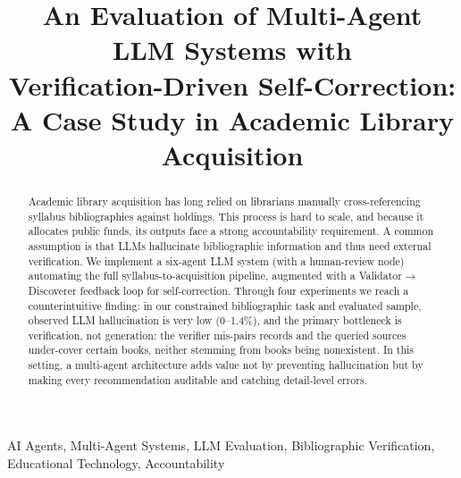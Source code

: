 \documentclass[conference]{IEEEtran}
\begin{document}
\title{An Evaluation of Multi-Agent LLM Systems with\\
Verification-Driven Self-Correction:\\
A Case Study in Academic Library Acquisition}

\author{
\and
{}
}

\maketitle

\begin{abstract}
Academic library acquisition has long relied on librarians manually
cross-referencing syllabus bibliographies against holdings. This process is hard
to scale, and because it allocates public funds, its outputs face a strong
accountability requirement. A common assumption is that LLMs hallucinate bibliographic
information and thus need external verification. We implement a six-agent LLM
system (with a human-review node) automating the full syllabus-to-acquisition
pipeline, augmented with a Validator$\rightarrow$Discoverer feedback loop for
self-correction. Through four experiments we reach a counterintuitive finding:
in our constrained bibliographic task and evaluated sample, observed LLM
hallucination is very low (0--1.4\%), and the primary bottleneck is verification,
not generation: the verifier mis-pairs records and the queried sources
under-cover certain books, neither stemming from books being nonexistent. In this
setting, a multi-agent architecture adds value not by preventing hallucination
but by making every recommendation auditable and catching detail-level errors.
\end{abstract}

\begin{IEEEkeywords}
AI Agents, Multi-Agent Systems, LLM Evaluation, Bibliographic Verification,
Educational Technology, Accountability
\end{IEEEkeywords}

\end{document}

